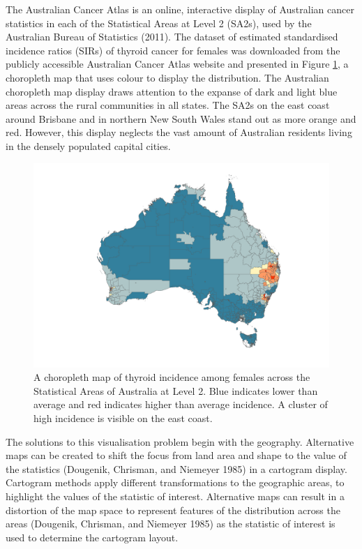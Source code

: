 The Australian Cancer Atlas is an online, interactive display of Australian cancer statistics in each of the Statistical Areas at Level 2 (SA2s), used by the Australian Bureau of Statistics (2011). The dataset of estimated standardised incidence ratios (SIRs) of thyroid cancer for females was downloaded from the publicly accessible Australian Cancer Atlas website and presented in Figure \ref{fig:choro}, a choropleth map that uses colour to display the distribution. The Australian choropleth map display draws attention to the expanse of dark and light blue areas across the rural communities in all states. The SA2s on the east coast around Brisbane and in northern New South Wales stand out as more orange and red. However, this display neglects the vast amount of Australian residents living in the densely populated capital cities.

\begin{figure}
\includegraphics[width=0.95\linewidth]{kobakian-cook_files/figure-latex/choro-1} \caption{A choropleth map of thyroid incidence among females across the Statistical Areas of Australia at Level 2. Blue indicates lower than average and red indicates higher than average incidence. A cluster of high incidence is visible on the east coast.}\label{fig:choro}
\end{figure}

The solutions to this visualisation problem begin with the geography. Alternative maps can be created to shift the focus from land area and shape to the value of the statistics (Dougenik, Chrisman, and Niemeyer 1985) in a cartogram display. Cartogram methods apply different transformations to the geographic areas, to highlight the values of the statistic of interest. Alternative maps can result in a distortion of the map space to represent features of the distribution across the areas (Dougenik, Chrisman, and Niemeyer 1985) as the statistic of interest is used to determine the cartogram layout.

